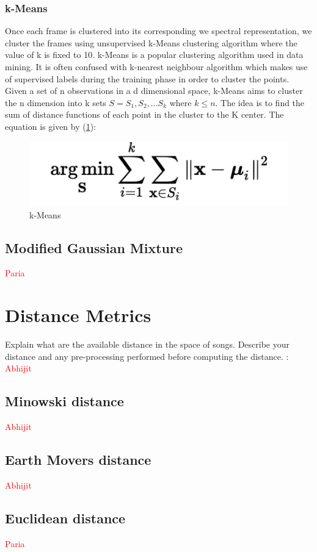 \documentclass[12pt]{article}
\begin{document}
\subsubsection{k-Means}
Once each frame is clustered into its corresponding we spectral representation, we cluster the frames using unsupervised k-Means clustering algorithm where the value of k is  fixed to 10. k-Means is a popular clustering algorithm used in data mining. It is often confused with k-nearest neighbour algorithm which makes use of supervised labels during the training phase in order to cluster the points. Given a set of n observations in a d dimensional space, k-Means aims to cluster the n dimension into k sets $S = {S_1,S_2,...S_k}$ where $ k \leq n$. The idea is to find the sum of distance functions of each point in the cluster to the K center. The equation is given by (\ref{kmeans}):

\begin{figure}[h]\label{kmeans}
\center
\includegraphics{fig2.png}
\caption{k-Means}
\end{figure}

\subsection{Modified Gaussian Mixture} \textcolor{red}{Paria}

\section{Distance Metrics}
Explain what are the available distance in the space of songs.
Describe your distance and any pre-processing performed before
computing the distance. : \textcolor{red}{Abhijit}
\subsection{Minowski distance}\textcolor{red}{Abhijit}
\subsection{Earth Movers distance}\textcolor{red}{Abhijit}
\subsection{Euclidean distance}\textcolor{red}{Paria}
\end{document}
